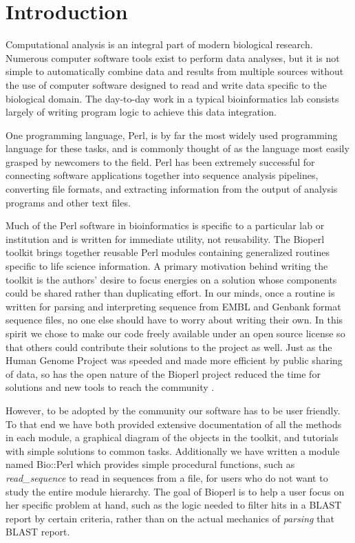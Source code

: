 \documentclass[12pt]{article}
\begin{document}
\section{Introduction}

Computational analysis is an integral part of modern biological
research.  Numerous computer software tools exist to perform data
analyses, but it is not simple to automatically combine data and
results from multiple sources without the use of computer software
designed to read and write data specific to the biological domain.
The day-to-day work in a typical bioinformatics lab consists largely
of writing program logic to achieve this data integration.

One programming language, Perl, is by far the most widely used
programming language for these tasks, and is commonly thought of as
the language most easily grasped by newcomers to the field.  Perl has
been extremely successful for connecting software applications together into
sequence analysis pipelines, converting file formats, and extracting
information from the output of analysis programs and other text files.

Much of the Perl software in bioinformatics is specific to a
particular lab or institution and is written for immediate
utility, not reusability.  The Bioperl toolkit brings together
reusable Perl modules containing generalized routines specific to life
science information.  A primary motivation behind writing the toolkit
is the authors' desire to focus energies on a solution whose
components could be shared rather than duplicating effort.  In our
minds, once a routine is written for parsing and interpreting sequence
from EMBL and Genbank format sequence files, no one else should have
to worry about writing their own.  In this spirit we chose to make our
code freely available under an open source license
\cite{open-source-ref} so that others could contribute their solutions
to the project as well.  Just as the Human Genome Project was speeded
and made more efficient by public sharing of data, so has the open
nature of the Bioperl project reduced the time for solutions and new
tools to reach the community \cite{waterston}.

However, to be adopted by the community our software has to be user
friendly.  To that end we have both provided extensive documentation
of all the methods in each module, a graphical diagram of the objects
in the toolkit, and tutorials with simple solutions to common tasks.
Additionally we have written a module named Bio::Perl which provides
simple procedural functions, such as \textit{read\_sequence} to read
in sequences from a file, for users who do not want to study the
entire module hierarchy.  The goal of Bioperl is to help a user focus
on her specific problem at hand, such as the logic needed to filter
hits in a BLAST \cite{blast} report by certain criteria, rather than
on the actual mechanics of \textit{parsing} that BLAST report.
\end{document}
